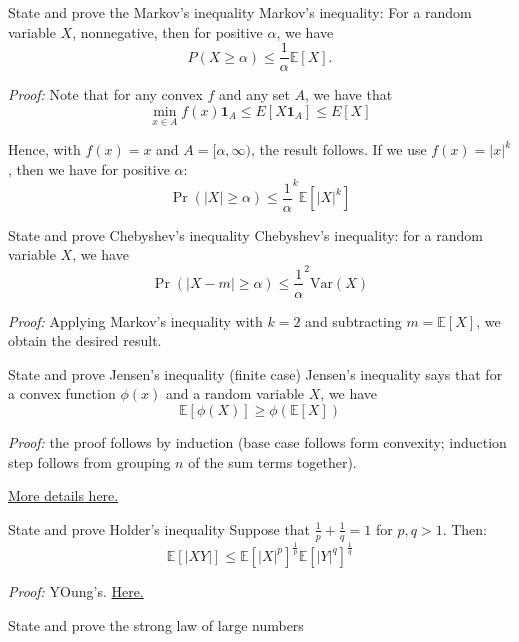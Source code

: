 \documentclass[avery5388,grid,frame]{flashcards}
\newcommand{\E}{\mathbb{E}}
\newcommand{\Var}{\text{Var}}
\begin{document}
\begin{flashcard}
    {State and prove the Markov's inequality}
    Markov's inequality: For a random variable $X$, nonnegative, then for positive $\alpha$, we have
    $$P(X \geq \alpha) \leq \frac 1 \alpha \E[X].$$

    \emph{Proof:} Note that for any convex $f$ and any set $A$, we have that
    $$\min_{x \in A} f(x) \mathbf 1_{A} \leq E[X \mathbf 1_{A}] \leq E[X]$$

    Hence, with $f(x) = x$ and $A = [\alpha,\infty)$, the result follows. If we use $f(x) = |x|^k$, then we have for positive $\alpha$:
    $$\Pr(|X| \geq \alpha) \leq \frac 1 \alpha^k \E[|X|^k]$$
\end{flashcard}


\begin{flashcard}
    {State and prove Chebyshev's inequality}
    Chebyshev's inequality: for a random variable $X$, we have
    $$\Pr(|X - m| \geq \alpha) \leq \frac 1 \alpha^2 \Var(X)$$

    \emph{Proof:} Applying Markov's inequality with $k=2$ and subtracting $m = \E[X]$, we obtain the desired result.
\end{flashcard}


\begin{flashcard}
    {State and prove Jensen's inequality (finite case)}
    Jensen's inequality says that for a convex function $\phi(x)$ and a random variable $X$, we have
    $$\E[\phi(X)] \geq \phi(\E[X])$$

    \emph{Proof:} the proof follows by induction (base case follows form convexity; induction step follows from grouping $n$ of the sum terms together).

    \href{https://en.wikipedia.org/wiki/Jensen%27s_inequality#Proofs}{More details here.}
\end{flashcard}


\begin{flashcard}
    {State and prove Holder's inequality}
    Suppose that $\frac 1 p + \frac 1 q = 1$ for $p,q>1$. Then:
    $$\E[|XY|] \leq \E[|X|^p]^{\frac 1 p} \E[|Y|^q]^{\frac 1 q}$$

    \emph{Proof:} YOung's. \href{https://en.wikipedia.org/wiki/H%C3%B6lder%27s_inequality#Proof_of_H%C3%B6lder's_inequality}{Here.}
\end{flashcard}


\begin{flashcard}
    {State and prove the strong law of large numbers}
    
\end{flashcard}
\end{document}
